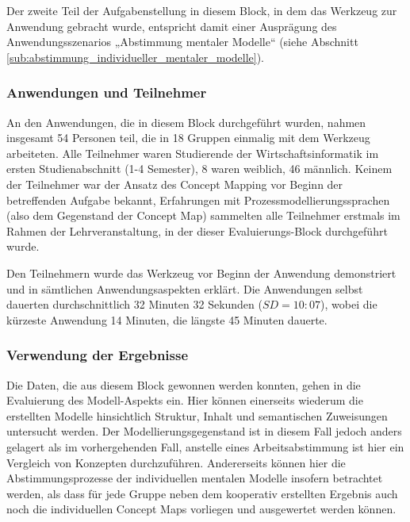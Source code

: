 Der zweite Teil der Aufgabenstellung in diesem Block, in dem das Werkzeug zur Anwendung gebracht wurde, entspricht damit einer Ausprägung des Anwendungsszenarios „Abstimmung mentaler Modelle“ (siehe Abschnitt \ref{sub:abstimmung_individueller_mentaler_modelle}).


\subsubsection{Anwendungen und Teilnehmer} %
\label{ssub:3_teilnehmer}

An den Anwendungen, die in diesem Block durchgeführt wurden, nahmen insgesamt 54 Personen teil, die in 18 Gruppen einmalig mit dem Werkzeug arbeiteten. Alle Teilnehmer waren Studierende der Wirtschaftsinformatik im ersten Studienabschnitt (1-4 Semester), 8 waren weiblich, 46 männlich. Keinem der Teilnehmer war der Ansatz des Concept Mapping vor Beginn der betreffenden Aufgabe bekannt, Erfahrungen mit Prozessmodellierungssprachen (also dem Gegenstand der Concept Map) sammelten alle Teilnehmer erstmals im Rahmen der Lehrveranstaltung, in der dieser Evaluierungs-Block durchgeführt wurde.

Den Teilnehmern wurde das Werkzeug vor Beginn der Anwendung demonstriert und in sämtlichen Anwendungsaspekten erklärt. Die Anwendungen selbst dauerten durchschnittlich 32 Minuten 32 Sekunden ($SD=10:07$), wobei die kürzeste Anwendung 14 Minuten, die längste 45 Minuten dauerte.

\subsubsection{Verwendung der Ergebnisse} %
\label{ssub:3_verwendung_der_ergebnisse}

Die Daten, die aus diesem Block gewonnen werden konnten, gehen in die Evaluierung des Modell-Aspekts ein. Hier können einerseits wiederum die erstellten Modelle hinsichtlich Struktur, Inhalt und semantischen Zuweisungen untersucht werden. Der Modellierungsgegenstand ist in diesem Fall jedoch anders gelagert als im vorhergehenden Fall, anstelle eines Arbeitsabstimmung ist hier ein Vergleich von Konzepten durchzuführen. Andererseits können hier die Abstimmungsprozesse der individuellen mentalen Modelle insofern betrachtet werden, als dass für jede Gruppe neben dem kooperativ erstellten Ergebnis auch noch die individuellen Concept Maps vorliegen und ausgewertet werden können.

